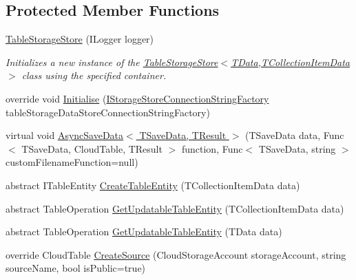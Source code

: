 \subsection*{Protected Member Functions}
\begin{DoxyCompactItemize}
\item 
\hyperlink{classCqrs_1_1Azure_1_1BlobStorage_1_1TableStorageStore_aabc36bc46ffb22b716cc7769a641cfab_aabc36bc46ffb22b716cc7769a641cfab}{Table\+Storage\+Store} (I\+Logger logger)
\begin{DoxyCompactList}\small\item\em Initializes a new instance of the \hyperlink{classCqrs_1_1Azure_1_1BlobStorage_1_1TableStorageStore_aabc36bc46ffb22b716cc7769a641cfab_aabc36bc46ffb22b716cc7769a641cfab}{Table\+Storage\+Store$<$\+T\+Data,\+T\+Collection\+Item\+Data$>$} class using the specified container. \end{DoxyCompactList}\item 
override void \hyperlink{classCqrs_1_1Azure_1_1BlobStorage_1_1TableStorageStore_ae775f039a168cc48c731314c7e494bb6_ae775f039a168cc48c731314c7e494bb6}{Initialise} (\hyperlink{interfaceCqrs_1_1Azure_1_1BlobStorage_1_1IStorageStoreConnectionStringFactory}{I\+Storage\+Store\+Connection\+String\+Factory} table\+Storage\+Data\+Store\+Connection\+String\+Factory)
\item 
virtual void \hyperlink{classCqrs_1_1Azure_1_1BlobStorage_1_1TableStorageStore_a1a1dcf73501d4e7fc23e8137627de6f7_a1a1dcf73501d4e7fc23e8137627de6f7}{Async\+Save\+Data$<$ T\+Save\+Data, T\+Result $>$} (T\+Save\+Data data, Func$<$ T\+Save\+Data, Cloud\+Table, T\+Result $>$ function, Func$<$ T\+Save\+Data, string $>$ custom\+Filename\+Function=null)
\item 
abstract I\+Table\+Entity \hyperlink{classCqrs_1_1Azure_1_1BlobStorage_1_1TableStorageStore_a168a634f7f55bd264e01bd7e0f1f9f15_a168a634f7f55bd264e01bd7e0f1f9f15}{Create\+Table\+Entity} (T\+Collection\+Item\+Data data)
\item 
abstract Table\+Operation \hyperlink{classCqrs_1_1Azure_1_1BlobStorage_1_1TableStorageStore_a1308b107766a375b7b8dcc92d9080393_a1308b107766a375b7b8dcc92d9080393}{Get\+Updatable\+Table\+Entity} (T\+Collection\+Item\+Data data)
\item 
abstract Table\+Operation \hyperlink{classCqrs_1_1Azure_1_1BlobStorage_1_1TableStorageStore_ae476c94b77d9c602aef934bd8c1b20ea_ae476c94b77d9c602aef934bd8c1b20ea}{Get\+Updatable\+Table\+Entity} (T\+Data data)
\item 
override Cloud\+Table \hyperlink{classCqrs_1_1Azure_1_1BlobStorage_1_1TableStorageStore_ad504317a3b2c07172f50b8e7b8d0f78e_ad504317a3b2c07172f50b8e7b8d0f78e}{Create\+Source} (Cloud\+Storage\+Account storage\+Account, string source\+Name, bool is\+Public=true)

\end{DoxyCompactItemize}
